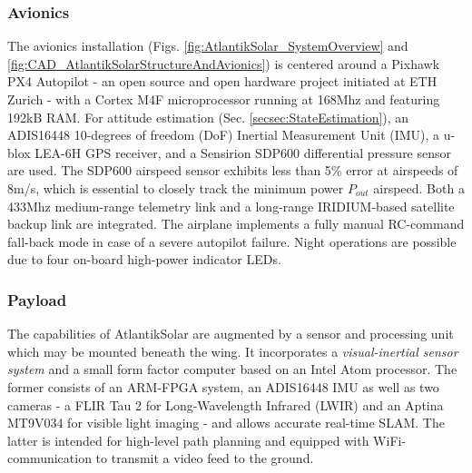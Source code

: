 \subsubsection{Avionics} \label{secsec:Avionics}
The avionics installation (Figs. \ref{fig:AtlantikSolar_SystemOverview} and \ref{fig:CAD_AtlantikSolarStructureAndAvionics}) is centered around a Pixhawk PX4 Autopilot - an open source and open hardware project initiated at ETH Zurich - with a Cortex M4F microprocessor running at 168Mhz and featuring 192kB RAM. For attitude estimation (Sec. \ref{secsec:StateEstimation}), an ADIS16448 10-degrees of freedom (DoF) Inertial Measurement Unit (IMU), a u-blox LEA-6H GPS receiver, and a Sensirion SDP600 differential pressure sensor are used. The SDP600 airspeed sensor exhibits less than 5\% error at airspeeds of 8m/s, which is essential to closely track the minimum power $P_{out}$ airspeed. Both a 433Mhz medium-range telemetry link and a long-range IRIDIUM-based satellite backup link are integrated. The airplane implements a fully manual RC-command fall-back mode in case of a severe autopilot failure. Night operations are possible due to four on-board high-power indicator LEDs.

\subsubsection{Payload}
The capabilities of AtlantikSolar are augmented by a sensor and processing unit which may be mounted beneath the wing. It incorporates a \emph{visual-inertial sensor system} \cite{nikolic2014synchronized} and a small form factor computer based on an Intel Atom processor. The former consists of an ARM-FPGA system, an ADIS16448 IMU as well as two cameras - a FLIR Tau 2 for Long-Wavelength Infrared (LWIR) and an Aptina MT9V034 for visible light imaging - and allows accurate real-time SLAM\cite{Leutenegger_PhD}. The latter is intended for high-level path planning and equipped with WiFi-communication to transmit a video feed to the ground.

